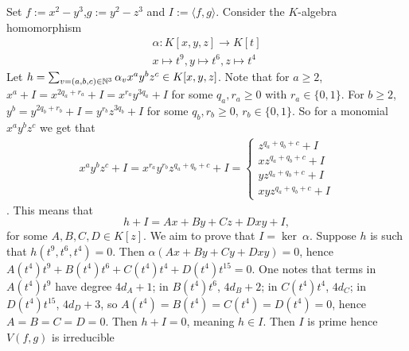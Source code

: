 \begin{example}\label{OneToOneButNotIso}
    Set $f:=x^2-y^3$,$g:=y^2-z^3$ and $I:=\langle f,g\rangle$. Consider the $K$-algebra homomorphism
    \begin{gather*}
        \alpha : K[x,y,z]\rightarrow K[t]\\
        x\mapsto t^9, y\mapsto t^6, z\mapsto t^4
    \end{gather*} 
    Let $h=\sum_{v=(a,b,c)\in\mathbb{N}^3} \alpha_v x^ay^bz^c\in K[x,y,z]$. Note that for $a\geq 2$, $x^a+I=x^{2q_a+r_a}+I=x^{r_a}y^{3q_a}+I$ for some $q_a,r_a\geq 0$ with $r_a\in\{0,1\}$. For $b\geq 2$, $y^b=y^{2q_b+r_b}+I=y^{r_b}z^{3q_b}+I$ for some $q_b,r_b\geq 0$, $r_b\in \{0,1\}$. So for a monomial $x^ay^bz^c$ we get that 
    \begin{align*}
        x^ay^bz^c +I = x^{r_a}y^{r_b}z^{q_a+q_b+c}+ I =\begin{cases}
            z^{q_a+q_b+c}+ I\\
            xz^{q_a+q_b+c}+ I\\
            yz^{q_a+q_b+c}+ I\\
            xyz^{q_a+q_b+c}+ I
        \end{cases}
    \end{align*}. 
    This means that 
    $$ h +I = Ax+By+Cz+Dxy + I,$$
    for some $A,B,C,D\in K[z]$. We aim to prove that $I=\ker \ \alpha$. Suppose $h$ is such that $h(t^9,t^6,t^4)=0$. Then $\alpha(Ax+By+Cy+Dxy)=0$, hence $A(t^4)t^9+B(t^4)t^6+C(t^4)t^4+D(t^4)t^{15}=0$. One notes that terms in $A(t^4)t^9$ have degree $4d_A+1$; in $B(t^4)t^6$, $4d_B+2$; in $C(t^4)t^4$, $4d_C$; in $D(t^4)t^{15}$, $4d_D+3$, so $A(t^4)=B(t^4)=C(t^4)=D(t^4)=0$, hence $A=B=C=D=0$. Then $h+I=0$, meaning $h\in I$. Then $I$ is prime hence $V(f,g)$ is irreducible  
\end{example}
